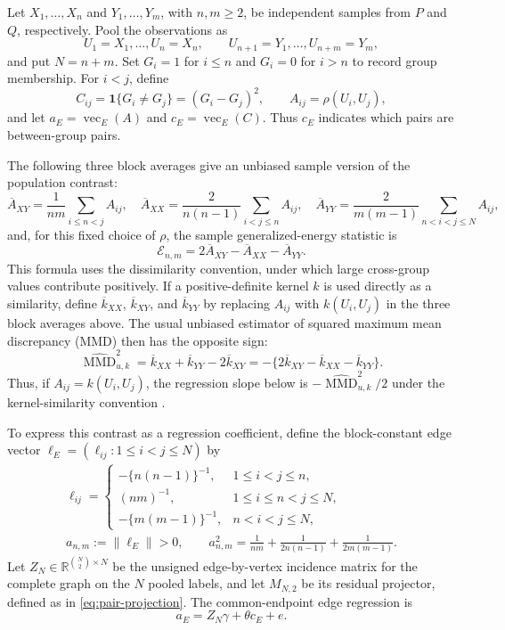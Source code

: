 \documentclass[11pt]{article}
\theoremstyle{plain}
\theoremstyle{definition}
\theoremstyle{remark}
\newcommand{\R}{\mathbb R}
\newcommand{\norm}[1]{\left\lVert #1\right\rVert}
\begin{document}
Let $X_1,\ldots,X_n$ and $Y_1,\ldots,Y_m$, with $n,m\ge2$, be independent
samples from $P$ and $Q$, respectively.  Pool the observations as
\[
 U_1=X_1,\ldots,U_n=X_n,
 \qquad
 U_{n+1}=Y_1,\ldots,U_{n+m}=Y_m,
\]
and put $N=n+m$.  Set $G_i=1$ for $i\le n$ and $G_i=0$ for $i>n$ to record
group membership.  For $i<j$, define
\begin{equation}
 C_{ij}=\mathbf 1\{G_i\ne G_j\}=(G_i-G_j)^2,
 \qquad
 A_{ij}=\rho(U_i,U_j),
 \label{eq:between-group-pair-indicator}
\end{equation}
and let $a_E=\operatorname{vec}_E(A)$ and
$c_E=\operatorname{vec}_E(C)$.  Thus $c_E$ indicates which pairs are
between-group pairs.

The following three block averages give an unbiased sample version of the
population contrast:
\[
 \overline A_{XY}=\frac1{nm}\sum_{i\le n<j}A_{ij},
 \quad
 \overline A_{XX}=\frac{2}{n(n-1)}\sum_{i<j\le n}A_{ij},
 \quad
 \overline A_{YY}=\frac{2}{m(m-1)}\sum_{n<i<j\le N}A_{ij},
\]
and, for this fixed choice of $\rho$, the sample generalized-energy statistic is
\[
 \mathcal E_{n,m}=2\overline A_{XY}-\overline A_{XX}-\overline A_{YY}.
\]
This formula uses the dissimilarity convention, under which large cross-group
values contribute positively.  If a positive-definite kernel $k$ is used
directly as a similarity, define $\overline k_{XX}$, $\overline k_{XY}$, and
$\overline k_{YY}$ by replacing $A_{ij}$ with $k(U_i,U_j)$ in the three block
averages above.  The usual unbiased estimator of squared maximum mean
discrepancy (MMD) then has the opposite sign:
\[
 \widehat{\operatorname{MMD}}_{u,k}^2
 =\overline k_{XX}+\overline k_{YY}-2\overline k_{XY}
 =-\{2\overline k_{XY}-\overline k_{XX}-\overline k_{YY}\}.
\]
Thus, if $A_{ij}=k(U_i,U_j)$, the regression slope below is
$-\widehat{\operatorname{MMD}}_{u,k}^2/2$ under the kernel-similarity
convention \citep{SejdinovicEtAl2013}.

To express this contrast as a regression coefficient, define the
block-constant edge vector
$\ell_E=(\ell_{ij}:1\le i<j\le N)$ by
\begin{equation}
 \begin{gathered}
 \ell_{ij}=
 \begin{cases}
 -\{n(n-1)\}^{-1},&1\le i<j\le n,\\[1mm]
 (nm)^{-1},&1\le i\le n<j\le N,\\[1mm]
 -\{m(m-1)\}^{-1},&n<i<j\le N,
 \end{cases}\\[2mm]
 a_{n,m}:=\norm{\ell_E}>0,
 \qquad
 a_{n,m}^2
 =\frac1{nm}+\frac1{2n(n-1)}+\frac1{2m(m-1)}.
 \end{gathered}
 \label{eq:energy-edge-contrast-vector}
\end{equation}
Let $Z_N\in\R^{\binom{N}{2}\times N}$ be the unsigned edge-by-vertex
incidence matrix for the complete graph on the $N$ pooled labels, and let
$M_{N,2}$ be its residual projector,
defined as in \eqref{eq:pair-projection}.  The common-endpoint edge regression is
\begin{equation}
 a_E=Z_N\gamma+\theta c_E+e.
 \label{eq:simple-pooled-group-regression}
\end{equation}
\end{document}
